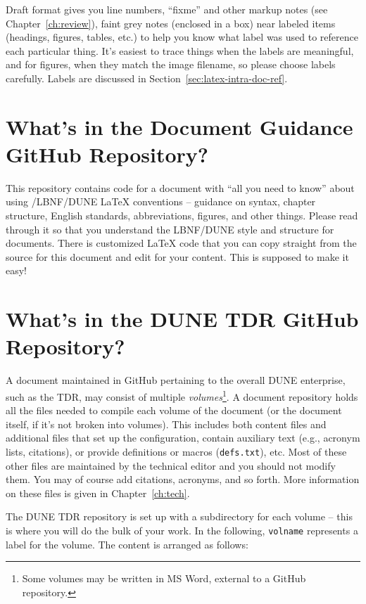 Draft format gives you line numbers, ``fixme'' and other markup notes (see Chapter~\ref{ch:review}), 
faint grey notes (enclosed in a box) near labeled items (headings, figures, tables, etc.) to help you know 
what label was used to reference each particular thing.  
It's easiest to trace things when the labels are meaningful, and for figures, when they match the image filename, so please choose labels carefully. Labels are discussed in Section~\ref{sec:latex-intra-doc-ref}.

\section{What's in the Document Guidance GitHub Repository?}
\label{sec:gen-guidance-repo}

This repository contains code for a document with ``all you need to know'' about using /LBNF/DUNE \LaTeX{}  conventions  -- guidance on syntax, chapter structure, English standards, abbreviations, figures, and other things. Please read through it so that you understand the LBNF/DUNE style and structure for documents.  There is customized \LaTeX{} code that you can copy straight from the source for this document and edit for your content.  This is supposed to make it easy!


\section{What's in the DUNE TDR GitHub Repository?}
\label{sec:gen-repo}

A document maintained in GitHub pertaining to the overall DUNE enterprise, such as the TDR, may consist of multiple \textit{volumes}\footnote{Some volumes may be written in MS Word, external to a GitHub repository.}.  A document repository holds all the files needed to compile each volume of the document (or the document itself, if it's not broken into volumes). This includes both content files and additional files that set up the configuration, 
contain auxiliary text (e.g., acronym lists, citations), or provide definitions or macros (\texttt{defs.txt}), etc.  Most of these other files are maintained by the technical editor and you should not modify them. You may of course add citations, acronyms, and so forth.   More information on these files is given in Chapter~\ref{ch:tech}.

The DUNE TDR repository is set up with a subdirectory for each volume -- this is where you will do the bulk of your work. In the following, \texttt{volname} represents a label for the volume. The content is
arranged as follows:


